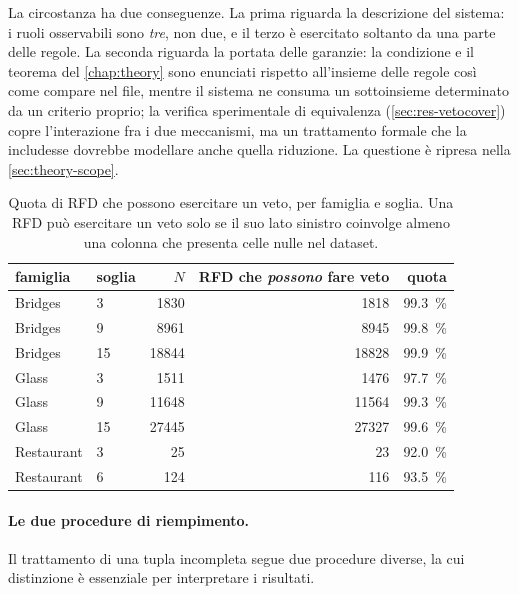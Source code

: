 La circostanza ha due conseguenze. La prima riguarda la descrizione del sistema: i ruoli
osservabili sono \emph{tre}, non due, e il terzo è esercitato soltanto da una parte delle regole.
La seconda riguarda la portata delle garanzie: la condizione \Vtwo{} e il teorema del
\autoref{chap:theory} sono enunciati rispetto all'insieme delle regole così come compare nel file,
mentre il sistema ne consuma un sottoinsieme determinato da un criterio proprio; la verifica
sperimentale di equivalenza (\autoref{sec:res-vetocover}) copre l'interazione fra i due
meccanismi, ma un trattamento formale che la includesse dovrebbe modellare anche quella
riduzione. La questione è ripresa nella \autoref{sec:theory-scope}.

\begin{table}[htbp]
\centering
\caption{Quota di RFD che possono esercitare un veto, per famiglia e soglia. Una RFD può
esercitare un veto solo se il suo lato sinistro coinvolge almeno una colonna che presenta celle
nulle nel dataset.}
\label{tab:veto-share}
\footnotesize
\begin{tabular}{llrrr}
\toprule
famiglia & soglia & $N$ & RFD che \emph{possono} fare veto & quota \\
\midrule
Bridges    & 3  & \num{1830}  & \num{1818} & \SI{99.3}{\percent} \\
Bridges    & 9  & \num{8961}  & \num{8945} & \SI{99.8}{\percent} \\
Bridges    & 15 & \num{18844} & \num{18828} & \SI{99.9}{\percent} \\
Glass      & 3  & \num{1511}  & \num{1476} & \SI{97.7}{\percent} \\
Glass      & 9  & \num{11648} & \num{11564} & \SI{99.3}{\percent} \\
Glass      & 15 & \num{27445} & \num{27327} & \SI{99.6}{\percent} \\
Restaurant & 3  & 25          & 23         & \SI{92.0}{\percent} \\
Restaurant & 6  & 124         & 116        & \SI{93.5}{\percent} \\
\bottomrule
\end{tabular}
\end{table}


\paragraph{Le due procedure di riempimento.} Il trattamento di una tupla incompleta segue due
procedure diverse, la cui distinzione è essenziale per interpretare i risultati.


